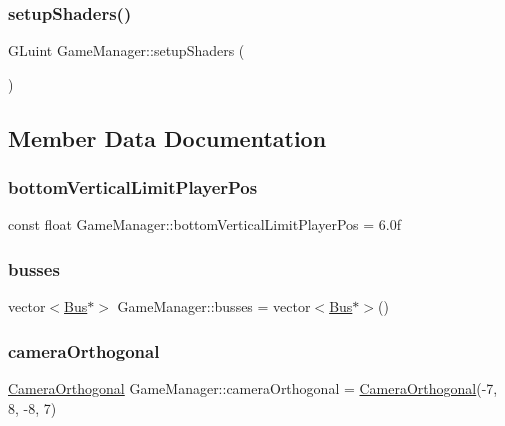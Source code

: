 \subsubsection{\texorpdfstring{setup\+Shaders()}{setupShaders()}}
{\footnotesize\ttfamily G\+Luint Game\+Manager\+::setup\+Shaders (\begin{DoxyParamCaption}{ }\end{DoxyParamCaption})\hspace{0.3cm}{\ttfamily [inline]}}



\subsection{Member Data Documentation}
\mbox{\label{class_game_manager_aac2d3978ba280076a75ba8863c2da9ac}} 
\subsubsection{\texorpdfstring{bottom\+Vertical\+Limit\+Player\+Pos}{bottomVerticalLimitPlayerPos}}
{\footnotesize\ttfamily const float Game\+Manager\+::bottom\+Vertical\+Limit\+Player\+Pos = 6.\+0f}

\mbox{\label{class_game_manager_aaca42616afec776da2bf0ccd0641f8e0}} 
\subsubsection{\texorpdfstring{busses}{busses}}
{\footnotesize\ttfamily vector$<$\hyperlink{class_bus}{Bus}$\ast$$>$ Game\+Manager\+::busses = vector$<$\hyperlink{class_bus}{Bus}$\ast$$>$()}

\mbox{\label{class_game_manager_a151b31ac1969c0e3723b7aec3a20c4b0}} 
\subsubsection{\texorpdfstring{camera\+Orthogonal}{cameraOrthogonal}}
{\footnotesize\ttfamily \hyperlink{class_camera_orthogonal}{Camera\+Orthogonal} Game\+Manager\+::camera\+Orthogonal = \hyperlink{class_camera_orthogonal}{Camera\+Orthogonal}(-\/7, 8, -\/8, 7)}

